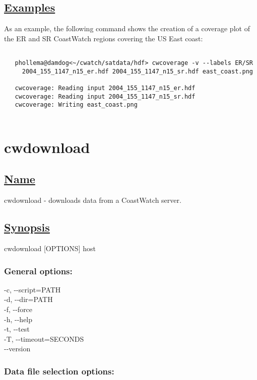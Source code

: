 \subsection*{\underline{Examples}}


  As an example, the following command shows the creation of a coverage plot of the ER and SR CoastWatch regions covering the US East coast: \begin{verbatim}

   phollema@damdog<~/cwatch/satdata/hdf> cwcoverage -v --labels ER/SR 
     2004_155_1147_n15_er.hdf 2004_155_1147_n15_sr.hdf east_coast.png
 
   cwcoverage: Reading input 2004_155_1147_n15_er.hdf
   cwcoverage: Reading input 2004_155_1147_n15_sr.hdf
   cwcoverage: Writing east_coast.png
 
\end{verbatim}


\newpage
\section{cwdownload} \hypertarget{cwdownload}{}
\subsection*{\underline{Name}}


   cwdownload - downloads data from a CoastWatch server.  
\subsection*{\underline{Synopsis}}


 cwdownload [OPTIONS] host
\subsubsection*{General options:}


  -c, -{-}script=PATH \\ 
 -d, -{-}dir=PATH \\ 
 -f, -{-}force \\ 
 -h, -{-}help \\ 
 -t, -{-}test \\ 
 -T, -{-}timeout=SECONDS \\ 
 -{-}version \\ 

\subsubsection*{Data file selection options:}


